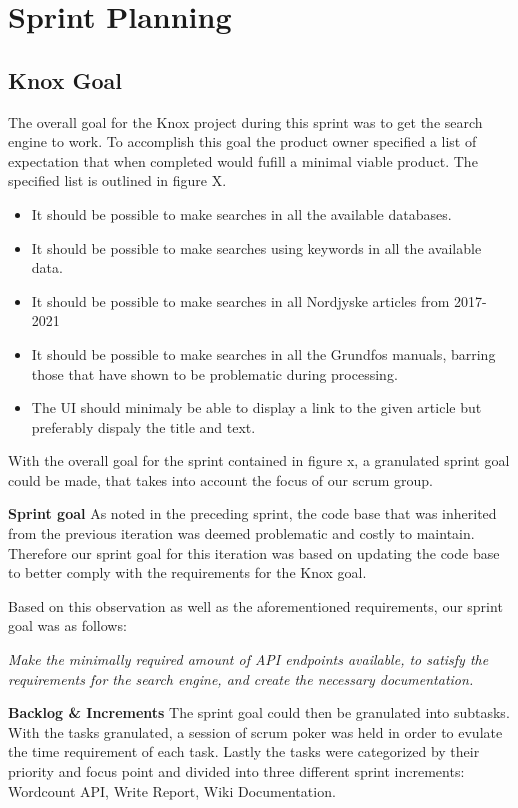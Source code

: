 \section{Sprint Planning}
\subsection{Knox Goal}
The overall goal for the Knox project during this sprint was to get the search engine to work. To accomplish this goal the product owner specified a list of expectation that when completed would fufill a minimal viable product. The specified list is outlined in figure X.
\begin{itemize}
	\item It should be possible to make searches in all the available databases.
	\item It should be possible to make searches using keywords in all the available data.
	\item It should be possible to make searches in all Nordjyske articles from 2017-2021
	\item It should be possible to make searches in all the Grundfos manuals, barring those that have shown to be problematic during processing.
	\item The UI should minimaly be able to display a link to the given article but preferably dispaly the title and text.
\end{itemize}

With the overall goal for the sprint contained in figure x, a granulated sprint goal could be made, that takes into account the focus of our scrum group.


\textbf{Sprint goal}
As noted in the preceding sprint, the code base that was inherited from the previous iteration was deemed problematic and costly to maintain. Therefore our sprint goal for this iteration was based on updating the code base to better comply with the requirements for the Knox goal.


Based on this observation as well as the aforementioned requirements, our sprint goal was as follows:


\textit{Make the minimally required amount of API endpoints available, to satisfy the requirements for the search engine, and create the necessary documentation.}


\textbf{Backlog \& Increments}
The sprint goal could then be granulated into subtasks. With the tasks granulated, a session of scrum poker was held in order to evulate the time requirement of each task. Lastly the tasks were categorized by their priority and focus point and divided into three different sprint increments: Wordcount API, Write Report, Wiki Documentation. 


